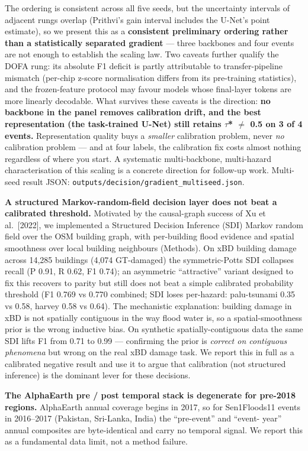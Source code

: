 The ordering is consistent across all five seeds, but the uncertainty
intervals of adjacent rungs overlap (Prithvi's gain interval includes
the U-Net's point estimate), so we present this as a \textbf{consistent
preliminary ordering rather than a statistically separated gradient} ---
three backbones and four events are not enough to establish the
scaling law. Two caveats further qualify the DOFA rung: its absolute F1
deficit is partly attributable to transfer-pipeline mismatch (per-chip
z-score normalisation differs from its pre-training statistics), and
the frozen-feature protocol may favour models whose final-layer tokens
are more linearly decodable. What survives these caveats is the
direction: \textbf{no backbone in the panel removes calibration drift, and
the best representation (the task-trained U-Net) still retains
$\tau$* $\neq$ 0.5 on 3 of 4 events.} Representation quality buys a \emph{smaller}
calibration problem, never \emph{no} calibration problem --- and at four
labels, the calibration fix costs almost nothing regardless of where
you start. A systematic multi-backbone, multi-hazard characterisation
of this scaling is a concrete direction for follow-up work. Multi-seed
result JSON: \texttt{outputs/decision/gradient\_multiseed.json}.

\textbf{A structured Markov-random-field decision layer does not beat a calibrated
threshold.} Motivated by the causal-graph success of Xu et al.~{[}2022{]}, we
implemented a Structured Decision Inference (SDI) Markov random field over
the OSM building graph, with per-building flood evidence and spatial
smoothness over local building neighbours (Methods). On xBD building damage
across 14,285 buildings (4,074 GT-damaged) the symmetric-Potts SDI collapses
recall (P 0.91, R 0.62, F1 0.74); an asymmetric ``attractive'' variant designed
to fix this recovers to parity but still does not beat a simple calibrated
probability threshold (F1 0.769 vs 0.770 combined; SDI loses per-hazard:
palu-tsunami 0.35 vs 0.58, harvey 0.58 vs 0.64). The mechanistic explanation:
building damage in xBD is not spatially contiguous in the way flood water is,
so a spatial-smoothness prior is the wrong inductive bias. On synthetic
spatially-contiguous data the same SDI lifts F1 from 0.71 to 0.99 ---
confirming the prior is \emph{correct on contiguous phenomena} but wrong on the
real xBD damage task. We report this in full as a calibrated negative result
and use it to argue that calibration (not structured inference) is the
dominant lever for these decisions.

\textbf{The AlphaEarth pre / post temporal stack is degenerate for pre-2018
regions.} AlphaEarth annual coverage begins in 2017, so for Sen1Floods11
events in 2016--2017 (Pakistan, Sri-Lanka, India) the ``pre-event'' and ``event-
year'' annual composites are byte-identical and carry no temporal signal. We
report this as a fundamental data limit, not a method failure.


